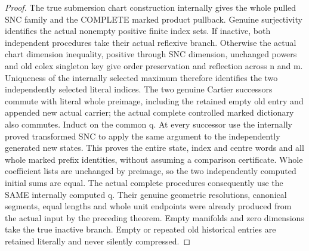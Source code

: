 \begin{proof}
The true submersion chart construction internally gives the whole pulled
SNC family and the COMPLETE marked product pullback. Genuine surjectivity
identifies the actual nonempty positive finite index sets. If inactive,
both independent procedures take their actual reflexive branch. Otherwise
the actual chart dimension inequality, positive through SNC dimension,
unchanged powers and old colex singleton key give order preservation and
reflection across n and m. Uniqueness of the internally selected maximum
therefore identifies the two independently selected literal indices.
The two genuine Cartier successors commute with literal whole preimage,
including the retained empty old entry and appended new actual carrier;
the actual complete controlled marked dictionary also commutes.
Induct on the common q. At every successor use the internally proved
transformed SNC to apply the same argument to the independently generated
new states. This proves the entire state, index and centre words and all
whole marked prefix identities, without assuming a comparison certificate.
Whole coefficient lists are unchanged by preimage, so the two independently
computed initial sums are equal. The actual complete procedures consequently
use the SAME internally computed q. Their genuine geometric resolutions,
canonical segments, equal lengths and whole unit endpoints were already
produced from the actual input by the preceding theorem. Empty manifolds
and zero dimensions take the true inactive branch. Empty or repeated old
historical entries are retained literally and never silently compressed.
\end{proof}

